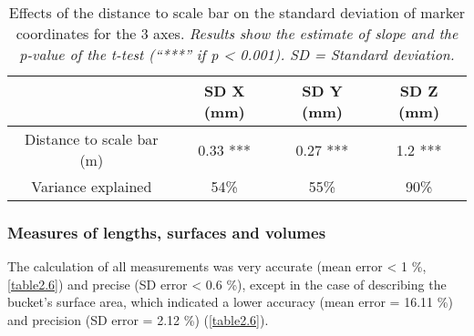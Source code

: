 \begin{table}[htbp]
  \centering
  \normalsize
  \caption[Effects of the distance to scale bar on the standard deviation of marker coordinates for the 3 axes.]{Effects of the distance to scale bar on the standard deviation of marker coordinates for the 3 axes. \textit{Results show the estimate of slope and the p-value of the t-test (“***” if p < 0.001). SD = Standard deviation.}}
  \label{table2.5}
    \begin{tabular}{*{4}{c}}
\toprule
                          & \textbf{SD X (mm)} & \textbf{SD Y (mm)} & \textbf{SD Z (mm)} \\ \midrule
Distance to scale bar (m) & 0.33 ***           & 0.27 ***           & 1.2 ***            \\
Variance explained        & 54\%               & 55\%               & 90\%               \\ \bottomrule
\end{tabular}
\end{table}

\subsubsection{Measures of lengths, surfaces and volumes}\label{chapitre2_3.2.2}
The calculation of all measurements was very accurate (mean error < 1 \%, \autoref{table2.6}) and precise (SD error < 0.6 \%), except in the case of describing the bucket’s surface area, which indicated a lower accuracy (mean error = 16.11 \%) and precision (SD error = 2.12 \%) (\autoref{table2.6}).

